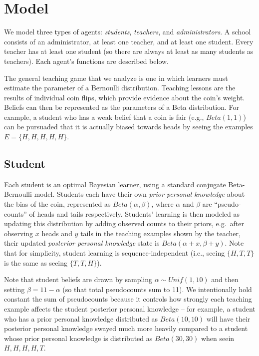 \documentclass[10pt, letterpaper]{article}
\begin{document}
\section{Model}\label{model}

We model three types of agents: \emph{students}, \emph{teachers}, and
\emph{administrators}. A school consists of an administrator, at least
one teacher, and at least one student. Every teacher has at least one
student (so there are always at least as many students as teachers).
Each agent's functions are described below.

The general teaching game that we analyze is one in which learners must
estimate the parameter of a Bernoulli distribution. Teaching lessons are
the results of individual coin flips, which provide evidence about the
coin's weight. Beliefs can then be represented as the parameters of a
Beta distribution. For example, a student who has a weak belief that a
coin is fair (e.g., \(Beta(1,1)\)) can be pursuaded that it is actually
biased towards heads by seeing the examples \(E = \{H, H, H, H, H\}\).

\subsection{Student}\label{student}

Each student is an optimal Bayesian learner, using a standard conjugate
Beta-Bernoulli model. Students each have their own \emph{prior personal
knowledge} about the bias of the coin, represented as
\(Beta(\alpha,\beta)\), where \(\alpha\) and \(\beta\) are
``pseudo-counts'' of heads and tails respectively. Students' learning is
then modeled as updating this distribution by adding observed counts to
their priors, e.g.~after observing \(x\) heads and \(y\) tails in the
teaching examples shown by the teacher, their updated \emph{posterior
personal knowledge} state is \(Beta(\alpha + x, \beta + y)\). Note that
for simplicity, student learning is sequence-independent (i.e., seeing
\(\{H, T, T\}\) is the same as seeing \(\{T, T, H\}\)).

Note that student beliefs are drawn by sampling
\(\alpha \sim Unif(1,10)\) and then setting \(\beta = 11 - \alpha\) (so
that total pseudocounts sum to 11). We intentionally hold constant the
sum of pseudocounts because it controls how strongly each teaching
example affects the student posterior personal knowledge -- for example,
a student who has a prior personal knowledge distributed as
\(Beta(10,10)\) will have their posterior personal knowledge swayed much
more heavily compared to a student whose prior personal knowledge is
distributed as \(Beta(30,30)\) when seein \({H, H, H, H, T}\).
\end{document}
